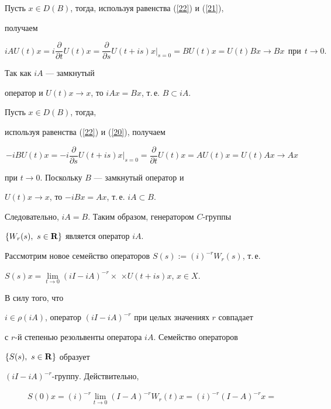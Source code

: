 \begin{pf}
Пусть $x\in D(B)$, тогда, используя равенства (\ref{22}) и (\ref{21}),


получаем


$$


iAU(t)x=i\frac{\partial}{\partial t}U(t)x=


\frac{\partial}{\partial s}U(t+is)x|_{s=0}=


BU(t)x=U(t)Bx\to Bx\ \ \text{при}\ \ t\to 0.


$$


Так как $iA$ --- замкнутый 


оператор и $U(t)x\to x$, то $iAx=Bx$, т.\,е. $B\subset iA$.


Пусть $x\in D(B)$, тогда,


используя равенства (\ref{22}) и (\ref{20}), получаем


$$


-iBU(t)x=-i\frac{\partial}{\partial s}U(t+is)x|_{s=0}=


\frac{\partial}{\partial t}


U(t)x=AU(t)x=U(t)Ax \to Ax


$$


при $t\to 0$. Поскольку $B$ --- замкнутый оператор и


$U(t)x\to x$, то $-iBx=Ax$, т.\,е. $iA\subset B$. 


Следовательно, $iA=B$. Таким образом, генератором $C$-группы


$\{W_r(s),\ s\in \bold R\}$ является оператор $iA$.





Рассмотрим новое семейство операторов $S(s):=(i)^{-r}W_r(s)$, т.\,е.


$S(s)x=\lim\limits_{t\to 0}(iI-iA)^{-r}\times$ $\times U(t+is)x$, $x\in X$.




В силу того, что


$i\in \rho (iA)$, оператор $(iI-iA)^{-r}$ при целых значениях $r$ совпадает


с $r$-й степенью резольвенты оператора $iA$. Семейство операторов


$\{S(s),\ s\in \bold R\}$ образует\linebreak


$(iI-iA)^{-r}$-группу. Действительно,


\begin{gather*}


S(0)x=(i)^{-r}\lim\limits_{t\to 0}(I-A)^{-r}W_r(t)x=(i)^{-r}(I-A)^{-r}x=



\end{gather*}
\end{pf}
